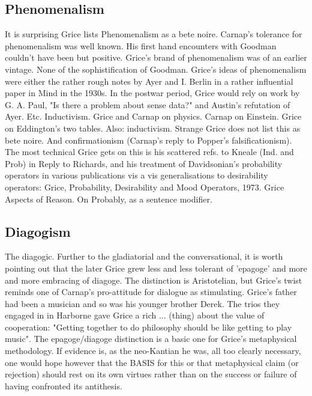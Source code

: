 \documentclass[10pt,titlepage]{book}
\begin{document}
{\subsection{Phenomenalism}

It is surprising Grice lists Phenomenalism as a bete 
noire. Carnap's tolerance  for phenomenalism was well known. His first hand 
encounters with Goodman  couldn't have been but positive. Grice's brand of 
phenomenalism was of an  earlier vintage. None of the sophistification of 
Goodman. Grice's ideas of  phenomenalism were either the rather rough notes by Ayer 
and I. Berlin in a  rather influential paper in Mind in the 1930s. In the 
postwar period, Grice  would rely on work by G. A. Paul, "Is there a problem 
about sense data?" and  Austin's refutation of Ayer. Etc. 
Inductivism.  Grice and Carnap on physics. Carnap on Einstein. Grice on 
Eddington's two  tables. Also: 
inductivism.  Strange Grice does not list this as bete noire. And 
confirmationism (Carnap's  reply to Popper's falsificationism). The most technical 
Grice gets on this is  his scattered refs. to Kneale (Ind. and Prob) in Reply 
to Richards, and his  treatment of Davidsonian's probability operators in 
various publications vis a  vis generalisations to desirability operators:  
Grice, Probability, Desirability and Mood  Operators, 1973. Grice Aspects of 
Reason. On Probably, as a sentence modifier.   

\subsection{Diagogism}

 The  diagogic. Further to the gladiatorial and the 
conversational, it is  worth  pointing out that the later Grice grew less and less 
tolerant of 'epagoge'   and more and more embracing of diagoge. The distinction is 
Aristotelian,  but  Grice's twist reminds one of Carnap's pro-attitude for 
dialogue  as   stimulating. Grice's  father had been a musician and so was 
his younger brother Derek.  The trios  they engaged in in Harborne gave Grice 
a rich ... (thing) about the value of  cooperation: "Getting together to do 
philosophy should be like getting  to  play music". The epagoge/diagoge 
distinction is a basic one for Grice's  metaphysical  methodology. If evidence 
is, as the neo-Kantian he was, all  too clearly  
necessary, one would hope however that the BASIS for this  or that 
metaphysical  claim (or rejection) should rest on its own virtues  rather than on 
the success  or failure of having confronted its  antithesis. 


}
\end{document}
